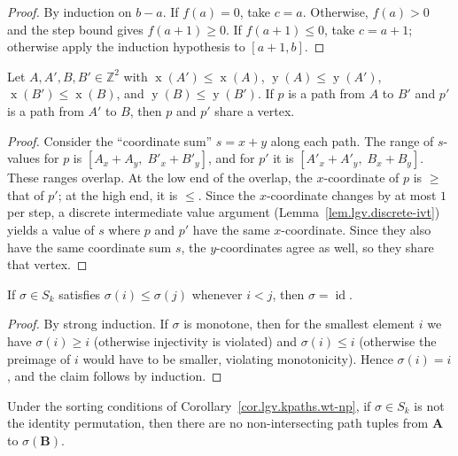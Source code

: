 \begin{proof}
\leanok
By induction on $b - a$.  If $f(a) = 0$, take $c = a$.  Otherwise,
$f(a) > 0$ and the step bound gives $f(a+1) \ge 0$.  If $f(a+1) \le 0$,
take $c = a + 1$; otherwise apply the induction hypothesis to $[a+1, b]$.
\end{proof}

\begin{lemma}
\label{lem.lgv.baby-jordan}
\leanhelper
\leanok
Let $A, A', B, B' \in \mathbb{Z}^2$ with
$\operatorname{x}(A') \le \operatorname{x}(A)$,
$\operatorname{y}(A) \le \operatorname{y}(A')$,
$\operatorname{x}(B') \le \operatorname{x}(B)$, and
$\operatorname{y}(B) \le \operatorname{y}(B')$.
If $p$ is a path from $A$ to $B'$ and $p'$ is a path from $A'$ to $B$,
then $p$ and $p'$ share a vertex.
\end{lemma}

\begin{proof}
Consider the ``coordinate sum'' $s = x + y$ along each path.
The range of $s$-values for $p$ is $[A_x + A_y,\; B'_x + B'_y]$,
and for $p'$ it is $[A'_x + A'_y,\; B_x + B_y]$.
These ranges overlap.  At the low end of the overlap, the
$x$-coordinate of $p$ is $\ge$ that of $p'$; at the high end, it is
$\le$.  Since the $x$-coordinate changes by at most $1$ per step,
a discrete intermediate value argument
(Lemma~\ref{lem.lgv.discrete-ivt}) yields a value of $s$ where
$p$ and $p'$ have the same $x$-coordinate.  Since they also have the
same coordinate sum $s$, the $y$-coordinates agree as well, so they
share that vertex.
\end{proof}

\begin{lemma}
\label{lem.lgv.monotone-perm-eq-id}
\leanhelper
\leanok
If $\sigma \in S_k$ satisfies $\sigma(i) \le \sigma(j)$ whenever $i < j$,
then $\sigma = \operatorname{id}$.
\end{lemma}

\begin{proof}
\leanok
By strong induction.  If $\sigma$ is monotone, then for the smallest
element $i$ we have $\sigma(i) \ge i$ (otherwise injectivity is violated)
and $\sigma(i) \le i$ (otherwise the preimage of $i$ would have to be
smaller, violating monotonicity).  Hence $\sigma(i) = i$, and the claim
follows by induction.
\end{proof}

\begin{lemma}
\label{lem.lgv.no-nipats-nonid}
\leanhelper
\leanok
Under the sorting conditions of Corollary~\ref{cor.lgv.kpaths.wt-np},
if $\sigma \in S_k$ is not the identity permutation, then there are no
non-intersecting path tuples from $\mathbf{A}$ to $\sigma(\mathbf{B})$.
\end{lemma}

